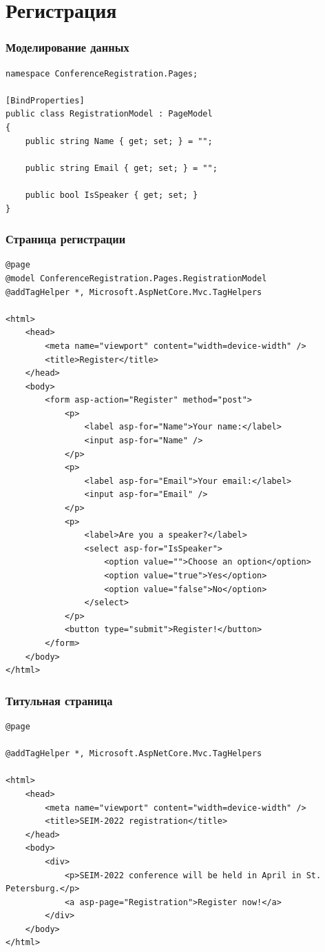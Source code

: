 \documentclass{../../slides-style}
\begin{document}
    \section{Регистрация}

    \begin{frame}[fragile]
        \frametitle{Моделирование данных}
        \begin{verbatim}
namespace ConferenceRegistration.Pages;

[BindProperties]
public class RegistrationModel : PageModel
{
    public string Name { get; set; } = "";

    public string Email { get; set; } = "";

    public bool IsSpeaker { get; set; }
}
        \end{verbatim}
    \end{frame}

    \begin{frame}[fragile]
        \frametitle{Страница регистрации}
        \begin{ssmall}
            \begin{verbatim}
@page
@model ConferenceRegistration.Pages.RegistrationModel
@addTagHelper *, Microsoft.AspNetCore.Mvc.TagHelpers

<html>
    <head>
        <meta name="viewport" content="width=device-width" />
        <title>Register</title>
    </head>
    <body>
        <form asp-action="Register" method="post">
            <p>
                <label asp-for="Name">Your name:</label>
                <input asp-for="Name" />
            </p>
            <p>
                <label asp-for="Email">Your email:</label>
                <input asp-for="Email" />
            </p>
            <p>
                <label>Are you a speaker?</label>
                <select asp-for="IsSpeaker">
                    <option value="">Choose an option</option>
                    <option value="true">Yes</option>
                    <option value="false">No</option>
                </select>
            </p>
            <button type="submit">Register!</button>
        </form>
    </body>
</html>
            \end{verbatim}
        \end{ssmall}
    \end{frame}

    \begin{frame}[fragile]
        \frametitle{Титульная страница}
        \begin{footnotesize}
            \begin{verbatim}
@page

@addTagHelper *, Microsoft.AspNetCore.Mvc.TagHelpers

<html>
    <head>
        <meta name="viewport" content="width=device-width" />
        <title>SEIM-2022 registration</title>
    </head>
    <body>
        <div>
            <p>SEIM-2022 conference will be held in April in St. Petersburg.</p>
            <a asp-page="Registration">Register now!</a>
        </div>
    </body>
</html>
            \end{verbatim}
        \end{footnotesize}
    \end{frame}
\end{document}
